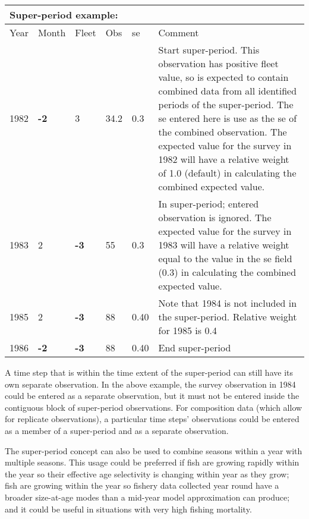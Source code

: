 \begin{center}
	\vspace*{-\baselineskip}
	\begin{tabular}{p{1cm} p{1cm} p{1cm} p{1cm} p{1cm} p{9cm}}
		\multicolumn{6}{l}{Super-period example:} \\
		\hline
		Year & Month & Fleet & Obs & \gls{se} & Comment \Tstrut\Bstrut\\
		\hline
		1982 \Tstrut & \textbf{-2} & 3 & 34.2 & 0.3 & Start super-period. This observation has positive fleet value, so is expected to contain combined data from all identified periods of the super-period. The \gls{se} entered here is use as the \gls{se} of the combined observation. The expected value for the survey in 1982 will have a relative weight of 1.0 (default) in calculating the combined expected value.\Bstrut\\
		\hline
		1983 \Tstrut & 2 & \textbf{-3} & 55 & 0.3 & In super-period; entered observation is ignored. The expected value for the survey in 1983 will have a relative weight equal to the value in the \gls{se} field (0.3) in calculating the combined expected value. \Bstrut\\
		\hline
		1985 \Tstrut & 2 & \textbf{-3}& 88 & 0.40 & Note that 1984 is not included in the super-period. Relative weight for 1985 is 0.4 \Bstrut\\
		\hline
		1986 & \textbf{-2} & \textbf{-3} & 88 & 0.40 & End super-period \Tstrut\Bstrut\\
		\hline
	\end{tabular}
\end{center}

A time step that is within the time extent of the super-period can still have its own separate observation. In the above example, the survey observation in 1984 could be entered as a separate observation, but it must not be entered inside the contiguous block of super-period observations. For composition data (which allow for replicate observations), a particular time steps' observations could be entered as a member of a super-period and as a separate observation.

The super-period concept can also be used to combine seasons within a year with multiple seasons. This usage could be preferred if fish are growing rapidly within the year so their effective age selectivity is changing within year as they grow; fish are growing within the year so fishery data collected year round have a broader size-at-age modes than a mid-year model approximation can produce; and it could be useful in situations with very high fishing mortality.

\pagebreak
